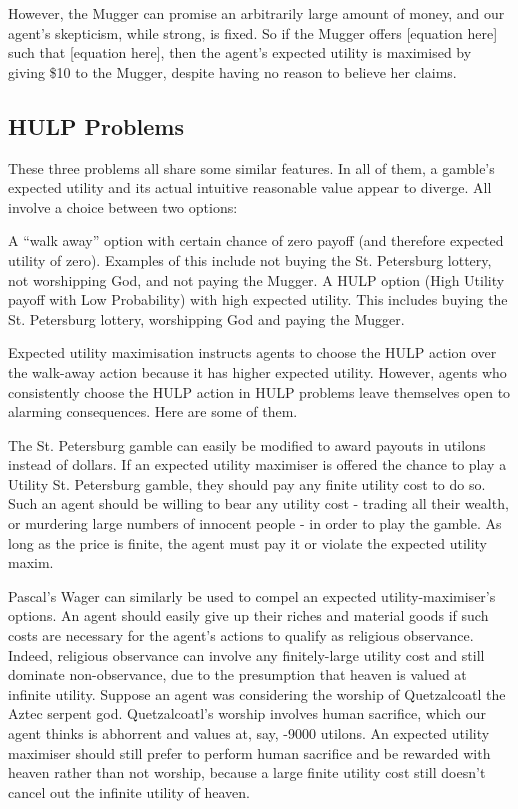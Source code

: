 \documentclass{article}
\begin{document}
However, the Mugger can promise an arbitrarily large amount of money, and our agent's skepticism, while strong, is fixed. So if the Mugger offers [equation here] such that [equation here], then the agent's expected utility is maximised by giving \$10 to the Mugger, despite having no reason to believe her claims.

\subsection{HULP Problems}
These three problems all share some similar features. In all of them, a gamble's expected utility and its actual intuitive reasonable value appear to diverge. All involve a choice between two options:

A “walk away” option with certain chance of zero payoff (and therefore expected utility of zero). Examples of this include not buying the St. Petersburg lottery, not worshipping God, and not paying the Mugger.
A HULP option (High Utility payoff with Low Probability) with high expected utility. This includes buying the St. Petersburg lottery, worshipping God and paying the Mugger.

Expected utility maximisation instructs agents to choose the HULP action over the walk-away action because it has higher expected utility. However, agents who consistently choose the HULP action in HULP problems leave themselves open to alarming consequences. Here are some of them.

The St. Petersburg gamble can easily be modified to award payouts in utilons instead of dollars. If an expected utility maximiser is offered the chance to play a Utility St. Petersburg gamble, they should pay any finite utility cost to do so. Such an agent should be willing to bear any utility cost - trading all their wealth, or murdering large numbers of innocent people - in order to play the gamble. As long as the price is finite, the agent must pay it or violate the expected utility maxim.

Pascal's Wager can similarly be used to compel an expected utility-maximiser's options. An agent should easily give up their riches and material goods if such costs are necessary for the agent's actions to qualify as religious observance. Indeed, religious observance can involve any finitely-large utility cost and still dominate non-observance, due to the presumption that heaven is valued at infinite utility. Suppose an agent was considering the worship of Quetzalcoatl the Aztec serpent god. Quetzalcoatl's worship involves human sacrifice, which our agent thinks is abhorrent and values at, say, -9000 utilons. An expected utility maximiser should still prefer to perform human sacrifice and be rewarded with heaven rather than not worship, because a large finite utility cost still doesn't cancel out the infinite utility of heaven. 
\end{document}
